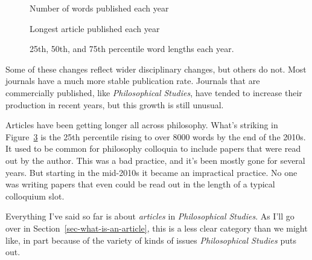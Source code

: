 \documentclass[
  10pt,
  letterpaper,
  DIV=11,
  numbers=noendperiod,
  twoside]{scrartcl}
\begin{document}
\begin{figure}


\caption{\label{fig-word-count-by-year}Number of words published each
year}

\end{figure}%

\begin{figure}


\caption{\label{fig-word-max-by-year}Longest article published each
year}

\end{figure}%

\begin{figure}


\caption{\label{fig-word-quartiles}25th, 50th, and 75th percentile word
lengths each year.}

\end{figure}%

Some of these changes reflect wider disciplinary changes, but others do
not. Most journals have a much more stable publication rate. Journals
that are commercially published, like \emph{Philosophical Studies}, have
tended to increase their production in recent years, but this growth is
still unusual.

Articles have been getting longer all across philosophy. What's striking
in Figure~\ref{fig-word-quartiles} is the 25th percentile rising to over
8000 words by the end of the 2010s. It used to be common for philosophy
colloquia to include papers that were read out by the author. This was a
bad practice, and it's been mostly gone for several years. But starting
in the mid-2010s it became an impractical practice. No one was writing
papers that even could be read out in the length of a typical colloquium
slot.

Everything I've said so far is about \emph{articles} in
\emph{Philosophical Studies}. As I'll go over in
Section~\ref{sec-what-is-an-article}, this is a less clear category than
we might like, in part because of the variety of kinds of issues
\emph{Philosophical Studies} puts out.
\end{document}
